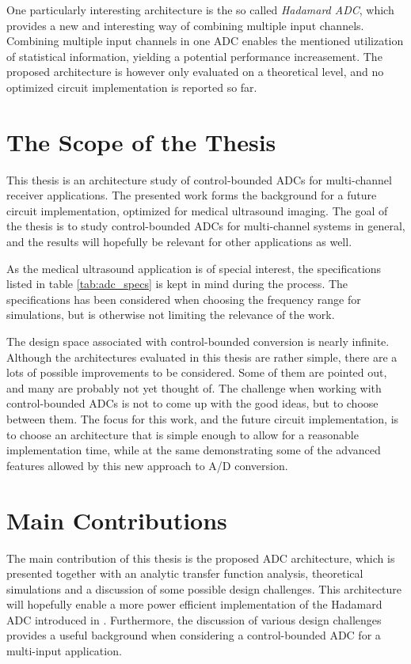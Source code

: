 One particularly interesting architecture is the so called \textit{Hadamard ADC}, which provides a new and interesting way of combining multiple input channels. Combining multiple input channels in one ADC enables the mentioned utilization of statistical information, yielding a potential performance increasement. The proposed architecture is however only evaluated on a theoretical level, and no optimized circuit implementation is reported so far.

\section{The Scope of the Thesis}
This thesis is an architecture study of control-bounded ADCs for multi-channel receiver applications. The presented work forms the background for a future circuit implementation, optimized for medical ultrasound imaging. The goal of the thesis is to study control-bounded ADCs for multi-channel systems in general, and the results will hopefully be relevant for other applications as well.

As the medical ultrasound application is of special interest, the  specifications listed in table \ref{tab:adc_specs} is kept in mind during the process. The specifications has been considered when choosing the frequency range for simulations, but is otherwise not limiting the relevance of the work.


The design space associated with control-bounded conversion is nearly infinite. Although the architectures evaluated in this thesis are rather simple, there are a lots of possible improvements to be considered. Some of them are pointed out, and many are probably not yet thought of. The challenge when working with control-bounded ADCs is not to come up with the good ideas, but to choose between them. The focus for this work, and the future circuit implementation, is to choose an architecture that is simple enough to allow for a reasonable implementation time, while at the same demonstrating some of the advanced features allowed by this new approach to A/D conversion.



\section{Main Contributions}
The main contribution of this thesis is the proposed ADC architecture, which is presented together with an analytic transfer function analysis, theoretical simulations and a discussion of some possible design challenges. This architecture will hopefully enable a more power efficient implementation of the Hadamard ADC introduced in \cite{malmberg_thesis}. Furthermore, the discussion of various design challenges provides a useful background when considering a control-bounded ADC for a multi-input application.

